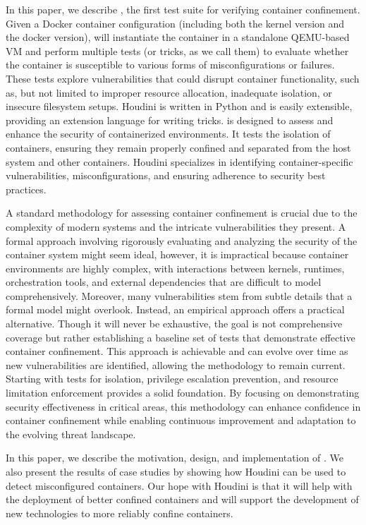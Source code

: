 In this paper, we describe \houdini, the first test suite for verifying container confinement. Given a Docker container configuration (including both the kernel version and the docker version), \houdini will instantiate the container in a standalone QEMU-based VM and perform multiple tests (or tricks, as we call them) to evaluate whether the container is susceptible to various forms of misconfigurations or failures. These tests explore vulnerabilities that could disrupt container functionality, such as, but not limited to improper resource allocation, inadequate isolation, or insecure filesystem setups. Houdini is written in Python and is easily extensible, providing an extension language for writing tricks. \houdini is designed to assess and enhance the security of containerized environments. It tests the isolation of containers, ensuring they remain properly confined and separated from the host system and other containers. Houdini specializes in identifying container-specific vulnerabilities, misconfigurations, and ensuring adherence to security best practices.

A standard methodology for assessing container confinement is crucial due to the complexity of modern systems and the intricate vulnerabilities they present. A formal approach involving rigorously evaluating and analyzing the security of the container system might seem ideal, however, it is impractical because container environments are highly complex, with interactions between kernels, runtimes, orchestration tools, and external dependencies that are difficult to model comprehensively. Moreover, many vulnerabilities stem from subtle details that a formal model might overlook. Instead, an empirical approach offers a practical alternative. Though it will never be exhaustive, the goal is not comprehensive coverage but rather establishing a baseline set of tests that demonstrate effective container confinement. This approach is achievable and can evolve over time as new vulnerabilities are identified, allowing the methodology to remain current. Starting with tests for isolation, privilege escalation prevention, and resource limitation enforcement provides a solid foundation. By focusing on demonstrating security effectiveness in critical areas, this methodology can enhance confidence in container confinement while enabling continuous improvement and adaptation to the evolving threat landscape.

In this paper, we describe the motivation, design, and implementation of \houdini. We also present the results of case studies by showing how Houdini can be used to detect misconfigured containers. Our hope with Houdini is that it will help with the deployment of better confined containers and will support the development of new technologies to more reliably confine containers.

